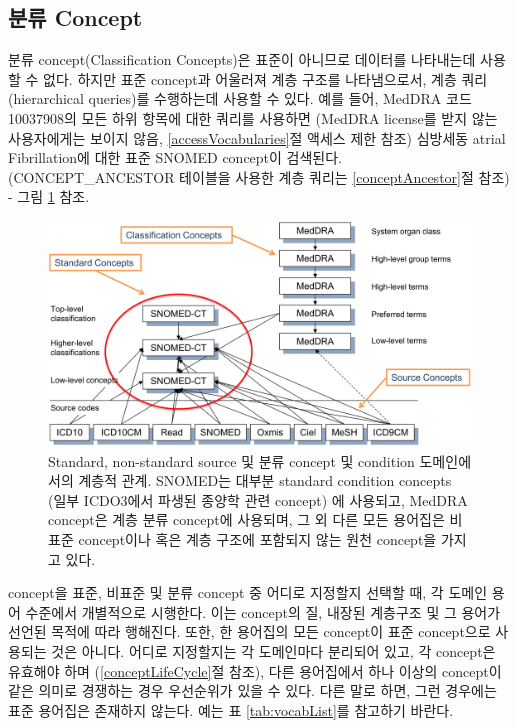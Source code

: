\documentclass[11pt]{book}
\theoremstyle{definition}
\theoremstyle{definition}
\theoremstyle{definition}
\theoremstyle{remark}
\begin{document}
\subsection{분류 Concept}\label{-concept}

분류 concept(Classification Concepts)은 표준이 아니므로 데이터를
나타내는데 사용할 수 없다. 하지만 표준 concept과 어울러져 계층 구조를
나타냄으로서, 계층 쿼리(hierarchical queries)를 수행하는데 사용할 수
있다. 예를 들어, MedDRA 코드 10037908의 모든 하위 항목에 대한 쿼리를
사용하면 (MedDRA license를 받지 않는 사용자에게는 보이지 않음,
\ref{accessVocabularies}절 액세스 제한 참조) 심방세동 atrial
Fibrillation에 대한 표준 SNOMED concept이 검색된다. (CONCEPT\_ANCESTOR
테이블을 사용한 계층 쿼리는 \ref{conceptAncestor}절 참조) - 그림
\ref{fig:hierarchy} 참조. 

\begin{figure}

{\centering \includegraphics[width=1\linewidth]{images/StandardizedVocabularies/hierarchy} 

}

\caption{Standard, non-standard source 및 분류 concept 및 condition 도메인에서의 계층적 관계. SNOMED는 대부분 standard condition concepts (일부 ICDO3에서 파생된 종양학 관련 concept) 에 사용되고, MedDRA concept은 계층 분류 concept에 사용되며, 그 외 다른 모든 용어집은 비표준 concept이나 혹은 계층 구조에 포함되지 않는 원천 concept을 가지고 있다.}\label{fig:hierarchy}
\end{figure}

concept을 표준, 비표준 및 분류 concept 중 어디로 지정할지 선택할 때, 각
도메인 용어 수준에서 개별적으로 시행한다. 이는 concept의 질, 내장된
계층구조 및 그 용어가 선언된 목적에 따라 행해진다. 또한, 한 용어집의
모든 concept이 표준 concept으로 사용되는 것은 아니다. 어디로 지정할지는
각 도메인마다 분리되어 있고, 각 concept은 유효해야 하며
(\ref{conceptLifeCycle}절 참조), 다른 용어집에서 하나 이상의 concept이
같은 의미로 경쟁하는 경우 우선순위가 있을 수 있다. 다른 말로 하면, 그런
경우에는 표준 용어집은 존재하지 않는다. 예는 표 \ref{tab:vocabList}를
참고하기 바란다.
\end{document}
